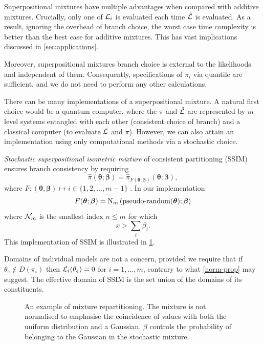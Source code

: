 \documentclass[usenatbib]{mnras}
\begin{document}
Superpositional mixtures have multiple advantages when compared with
additive mixtures. Crucially, only one of ${\cal L}_{i}$ is evaluated
each time $\hat{\cal L}$ is evaluated. As a result, ignoring the
overhead of branch choice, the worst case time complexity is better
than the best case for additive mixtures. This has vast implications
discussed in \cref{sec:applications}.

Moreover, superpositional mixtures branch choice is external to the
likelihoods and independent of them. Consequently, specifications of
$\pi_{i}$ via quantile are sufficient, and we do not need to perform
any other calculations.


There can be many implementations of a superpositional mixture. A
natural first choice would be a quantum computer, where the
$\hat{\pi}$ and $\hat{\cal L}$ are represented by \(m\) level
systems entangled with each other (consistent choice of branch) and a
classical computer (to evaluate ${\cal L}$ and $\pi$). However, we can
also attain an implementation using only computational methods via a
stochastic choice.

\emph{Stochastic superpositional isometric mixture} of consistent
partitioning (SSIM) ensures branch consistency by requiring
\begin{equation}
\hat{\pi}(\bm{\theta}; \bm{\beta}) = \hat{\pi}_{F(\bm{\theta};
  \bm{\beta})}(\bm{\theta};\bm{\beta}),
\end{equation}
where $F: (\bm{\theta}, \bm{\beta}) \mapsto i \in \{1, 2, \ldots, m-1\}$ . In our implementation
\begin{equation}
  F(\bm{\theta};\bm{\beta})= \text{{\cal N}}_{m}\left(\text{pseudo-random}(\bm{\theta}); \bm{\beta}\right)
\end{equation}
where \({\cal N}_{m}\) is the smallest index \(n \leq m\) for
which
\begin{equation}
x > \sum_{i}\beta_{i}.
\end{equation}
This implementation of SSIM is illustrated in \cref{fig:mixture}.

Domains of individual models are not a concern, provided we require
that if $\theta_{e} \not\in D(\pi_{i})$ then
${\cal L}_{i}(\theta_{e})=0$ for $i=1,\ldots,m$, contrary to what
\cref{norm-prop} may suggest. The effective domain of SSIM is the
set union of the domains of its constituents.

\begin{figure}  
  

  

  
  \caption{An example of mixture repartitioning. The mixture is not
    normalised to emphasise the coincidence of values with both the
    uniform distribution and a Gaussian. $\beta$ controls the
    probability of belonging to the Gaussian in the stochastic
    mixture.  \label{fig:mixture}}
\end{figure}
\end{document}
